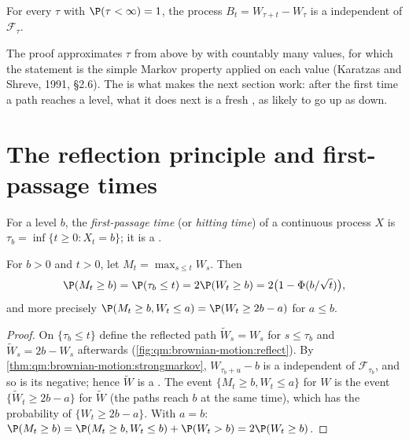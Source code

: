 \begin{theorem}\label{thm:qm:brownian-motion:strongmarkov}
For every  $\tau$ with $\P(\tau < \infty) = 1$, the process $B_t = W_{\tau + t} -
W_\tau$ is a  independent of $\mathcal F_\tau$.
\end{theorem}

\admitted

The proof approximates $\tau$ from above by  with countably many values, for
which the statement is the simple Markov property applied on each value (Karatzas and
Shreve, 1991, §2.6). The  is what makes the next section work: after
the first time a path reaches a level, what it does next is a fresh , as
likely to go up as down.

\section{The reflection principle and first-passage times}

\begin{definition}\label{def:qm:brownian-motion:passage}
For a level $b$, the \emph{first-passage time} (or \emph{hitting
time}) of a continuous process $X$ is $\tau_b = \inf\{t \ge 0 : X_t = b\}$;
it is a .
\end{definition}

\begin{theorem}\label{thm:qm:brownian-motion:reflection}
For $b > 0$ and $t > 0$, let $M_t = \max_{s \le t}W_s$. Then
\[
\P(M_t \ge b) = \P(\tau_b \le t) = 2\P(W_t \ge b) = 2\bigl(1 - \Phi(b/\sqrt t)\bigr),
\]
and more precisely $\P(M_t \ge b, W_t \le a) = \P(W_t \ge 2b - a)$ for $a \le b$.
\end{theorem}

\begin{proof}
On $\{\tau_b \le t\}$ define the reflected path $\tilde W_s = W_s$ for $s \le \tau_b$ and $\tilde
W_s = 2b - W_s$ afterwards (\cref{fig:qm:brownian-motion:reflect}). By
\cref{thm:qm:brownian-motion:strongmarkov}, $W_{\tau_b + u} - b$ is a 
independent of $\mathcal F_{\tau_b}$, and so is its negative; hence $\tilde W$ is a . The event $\{M_t \ge b, W_t \le a\}$ for $W$ is the event $\{\tilde W_t \ge 2b - a\}$ for
$\tilde W$ (the paths reach $b$ at the same time), which has the probability of $\{W_t \ge 2b -
a\}$. With $a = b$: $\P(M_t \ge b) = \P(M_t \ge b, W_t \le b) + \P(W_t > b) = 2\P(W_t \ge b)$.
\end{proof}

